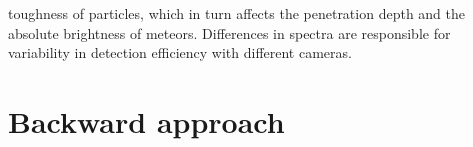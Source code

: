             


            toughness of particles, which in turn affects the penetration depth
            and the absolute brightness of meteors.
            Differences in spectra are responsible for variability in detection efficiency with different cameras.


\section{Backward approach} \label{ab}

